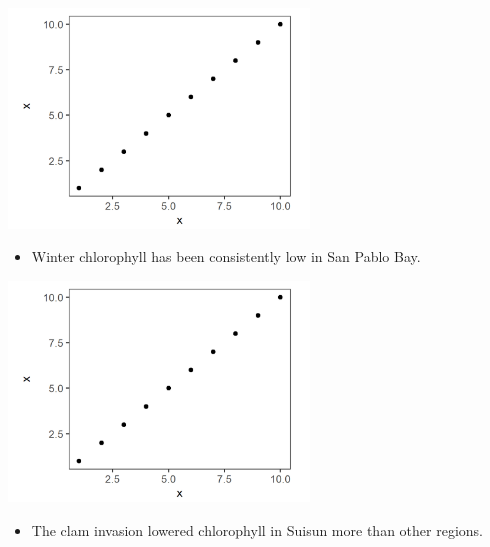 \documentclass[]{article}\usepackage[]{graphicx}\usepackage[]{color}
\begin{document}
\begin{Row}
  \begin{Cell}{4}
    \begin{center}
      \includegraphics[width=8cm,align=m]{figures/chlorophyll/placeholder_fig.png}
      \vspace{0.5cm}
      \begin{itemize}[leftmargin=1.5cm,rightmargin=1cm]
        \item Winter chlorophyll has been consistently low in San Pablo Bay.
      \end{itemize}
    \end{center}
  \end{Cell}

  \begin{Cell}{4}
    \begin{center}
      \includegraphics[width=8cm,align=m]{figures/chlorophyll/placeholder_fig.png}
      \vspace{0.5cm}
      \begin{itemize}[leftmargin=1.5cm,rightmargin=1cm]
        \item The clam invasion lowered chlorophyll in Suisun more than other regions.
      \end{itemize}
    \end{center}
  \end{Cell}


\end{Row}
\end{document}
